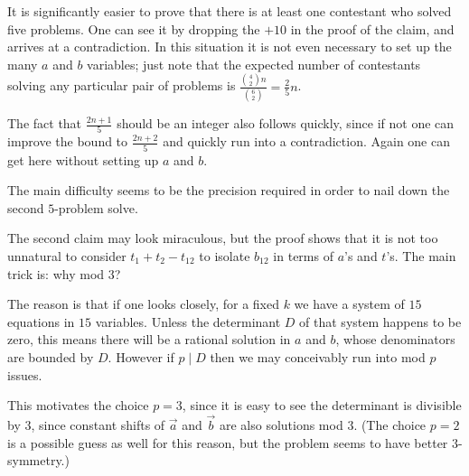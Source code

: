 \begin{remark*}
  It is significantly easier to prove that there
  is at least one contestant who solved five problems.
  One can see it by dropping the $+10$ in the proof of the claim,
  and arrives at a contradiction.
  In this situation it is not even necessary to set up
  the many $a$ and $b$ variables;
  just note that the expected number of contestants
  solving any particular pair of problems is
  $\frac{\binom42n}{\binom62} = \frac25n$.

  The fact that $\frac{2n+1}{5}$
  should be an integer also follows quickly,
  since if not one can improve the bound to $\frac{2n+2}{5}$
  and quickly run into a contradiction.
  Again one can get here without setting up $a$ and $b$.

  The main difficulty seems to be the precision required
  in order to nail down the second $5$-problem solve.
\end{remark*}

\begin{remark*}
  The second claim may look miraculous,
  but the proof shows that it is not too unnatural
  to consider $t_1 + t_2 - t_{12}$ to isolate $b_{12}$
  in terms of $a$'s and $t$'s.
  The main trick is: why mod $3$?

  The reason is that if one looks closely, for a
  fixed $k$ we have a system of $15$ equations in $15$ variables.
  Unless the determinant $D$ of that system happens to be zero,
  this means there will be a rational solution in $a$ and $b$,
  whose denominators are bounded by $D$.
  However if $p \mid D$ then we may conceivably run into mod $p$
  issues.

  This motivates the choice $p = 3$,
  since it is easy to see the determinant is divisible by $3$,
  since constant shifts of $\vec a$ and $\vec b$ are also solutions mod $3$.
  (The choice $p = 2$ is a possible guess as well for this reason,
  but the problem seems to have better $3$-symmetry.)
\end{remark*}

